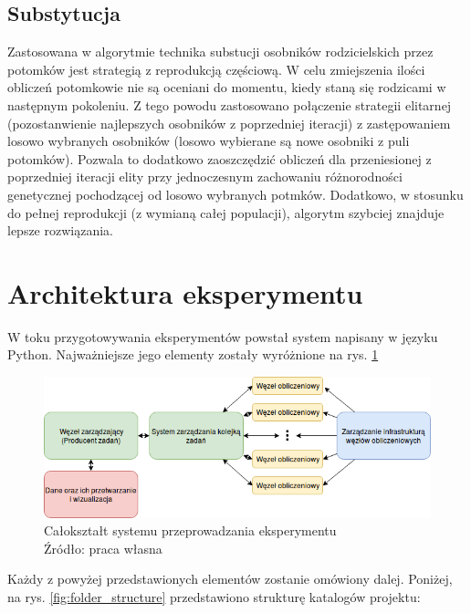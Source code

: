 \subsection{Substytucja}
Zastosowana w algorytmie technika substucji osobników rodzicielskich przez potomków jest strategią z reprodukcją częściową.
W celu zmiejszenia ilości obliczeń potomkowie nie są oceniani do momentu, kiedy staną się rodzicami w następnym pokoleniu.
Z tego powodu zastosowano połączenie strategii elitarnej (pozostanwienie najlepszych osobników z poprzedniej iteracji) z zastępowaniem losowo wybranych osobników (losowo wybierane są nowe osobniki z puli potomków).
Pozwala to dodatkowo zaoszczędzić obliczeń dla przeniesionej z poprzedniej iteracji elity przy jednoczesnym zachowaniu różnorodności genetycznej pochodzącej od losowo wybranych potmków.
Dodatkowo, w stosunku do pełnej reprodukcji (z wymianą całej populacji), algorytm szybciej znajduje lepsze rozwiązania.

\section{Architektura eksperymentu}
W toku przygotowywania eksperymentów powstał system napisany w języku Python\cite{CS-R9526}.
Najważniejsze jego elementy zostały wyróżnione na rys. \ref{fig:system_overview}

\begin{figure}[h!tb]
	 \centering
	 \includegraphics[width = 1.0\linewidth]{img/system_overview}
	 \caption{Całokształt systemu przeprowadzania eksperymentu \\
              Źródło: praca własna}
	 \label{fig:system_overview}
\end{figure}

Każdy z powyżej przedstawionych elementów zostanie omówiony dalej.
Poniżej, na rys. \ref{fig:folder_structure} przedstawiono strukturę katalogów projektu:

